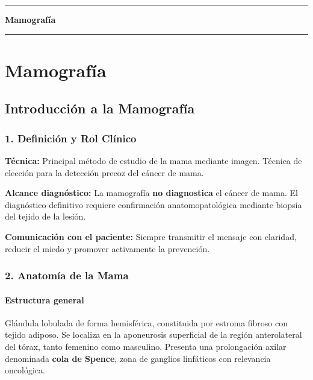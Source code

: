 \clearpage
\onecolumn
\thispagestyle{empty}
\vspace*{\fill}
\begin{center}
	{\color{radblue}\rule{\linewidth}{2pt}}\par
	\vspace{6mm}
	{\Huge\bfseries\color{radblue} Mamografía}\par
	\vspace{6mm}
	{\color{radblue}\rule{\linewidth}{2pt}}
\end{center}
\vspace*{\fill}
\clearpage
\twocolumn
\pagestyle{contenido}

	
	\section{Mamografía}
	
	\subsection{Introducción a la Mamografía}
	
	\subsubsection*{1. Definición y Rol Clínico}
	
	\textbf{Técnica:} Principal método de estudio de la mama mediante imagen. Técnica de elección para la detección precoz del cáncer de mama.
	
	\textbf{Alcance diagnóstico:} La mamografía \textbf{no diagnostica} el cáncer de mama. El diagnóstico definitivo requiere confirmación anatomopatológica mediante biopsia del tejido de la lesión.
	
	\textbf{Comunicación con el paciente:} Siempre transmitir el mensaje con claridad, reducir el miedo y promover activamente la prevención.
	
	\subsubsection*{2. Anatomía de la Mama}
	
	\paragraph{Estructura general}
	Glándula lobulada de forma hemisférica, constituida por estroma fibroso con tejido adiposo. Se localiza en la aponeurosis superficial de la región anterolateral del tórax, tanto femenino como masculino. Presenta una prolongación axilar denominada \textbf{cola de Spence}, zona de ganglios linfáticos con relevancia oncológica.
	
